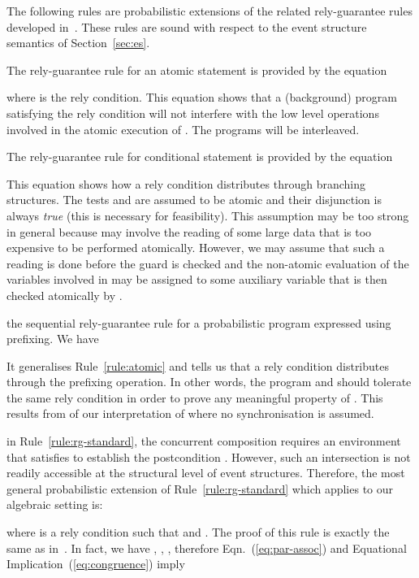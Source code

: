 \documentclass[review]{elsart}
\newcommand{\Eqn}[1]{Eqn.~(\ref{#1})}
\begin{document}
The following rules are probabilistic extensions of the related rely-guarantee rules developed in~\cite{Hoa11,Jon12}. These rules are  sound with respect to the event structure semantics of Section~\ref{sec:es}.

The rely-guarantee rule for an atomic statement  is provided by the equation

where  is the rely condition. This equation shows that a (background) program satisfying the rely condition  will not interfere with the low level operations involved in the atomic execution of . The programs will be interleaved.

The rely-guarantee rule for conditional statement is provided by the equation

This equation shows how a rely condition  distributes through branching structures. The tests  and  are assumed to be atomic and their disjunction is always \emph{true} (this is necessary for feasibility). This assumption may be too strong in general because  may involve the reading of some large data that is too expensive to be performed atomically. However, we may assume that such a reading is done before the guard  is checked and the non-atomic evaluation of the variables involved in  may be assigned to some auxiliary variable that is then checked atomically by .

the sequential rely-guarantee rule for a probabilistic program expressed using prefixing. We have  

It generalises Rule~\ref{rule:atomic} and tells us that a rely condition  distributes through the prefixing operation. In other words, the program  and   should tolerate the same rely condition in order to prove any meaningful property of . This results from of our interpretation of  where no synchronisation is assumed. 

in Rule~\ref{rule:rg-standard}, the concurrent composition  requires an environment that satisfies  to establish the postcondition . However, such an intersection is not readily accessible at the structural level of event structures. Therefore, the most general probabilistic extension of Rule~\ref{rule:rg-standard} which applies to our algebraic setting is:

where  is a rely condition such that  and .
The proof of this rule is exactly the same as in~\cite{Hoa11,Rab13}. In fact, we have , , , therefore \Eqn{eq:par-assoc} and Equational Implication~(\ref{eq:congruence}) imply 
\end{document}
